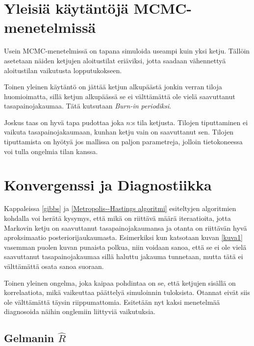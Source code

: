 \section{Yleisiä käytäntöjä MCMC-menetelmissä}

Usein MCMC-menetelmissä on tapana simuloida useampi kuin yksi ketju. Tällöin asetetaan näiden ketjujen aloitustilat eriäviksi, jotta saadaan vähennettyä aloitustilan vaikutusta lopputukokseen.

Toinen yleinen käytäntö on jättää ketjun alkupäästä jonkin verran tiloja huomioimatta, sillä ketjun alkupäässä se ei välttämättä ole vielä saavuttanut tasapainojakaumaa. Tätä kutsutaan \emph{Burn-in periodiksi}.

Joskus taas on hyvä tapa pudottaa joka $n$:s tila ketjusta. Tilojen tiputtaminen ei vaikuta tasapainojakaumaan, kunhan ketju vain on saavuttanut sen. Tilojen tiputtamista on hyötyä jos mallissa on paljon parametreja, jolloin tietokoneessa voi tulla ongelmia tilan kanssa.\cite{gelman_andrew_bayesian_nodate}

\section{Konvergenssi ja Diagnostiikka}

Kappaleissa \ref{gibbs} ja \ref{Metropolis--Hastings algoritmi} esiteltyjen algoritmien kohdalla voi herätä kysymys, että mikä on riittävä määrä iteraatioita, jotta Markovin ketju on saavuttanut tasapainojakaumansa ja otanta on riittävän hyvä aproksimaatio posteriorijaukaumasta. Esimerkiksi kun katsotaan kuvan \ref{kuva1} vasemman puolen kuvan punaista polkua, niin voidaan sanoa, että se ei ole vielä saavuttanut tasapainojakaumaa sillä haluttu jakauma tunnetaan, mutta tätä ei välttämättä osata sanoa suoraan. 

Toinen yleinen ongelma, joka kaipaa pohdintaa on se, että ketjujen sisällä on korrelaatiota, mikä vaikeuttaa päättelyä simuloinnin tuloksista. Otannat eivät siis ole välttämättä täysin riippumattomia. Esitetään nyt kaksi menetelmää diagnosoida näihin onglemiin liittyviä vaikutuksia.

\subsection{Gelmanin $\hat{R}$}

